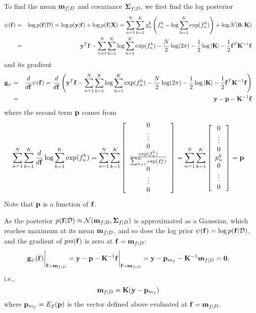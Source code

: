 \documentclass{article}
\begin{document}
To find the mean ${\bf m}_{f|D}$ and covariance ${\bf\Sigma}_{f|D}$,
we first find the log posterior
\begin{eqnarray}
  \psi({\bf f})&=&\log p({\bf f}|{\cal D})
  =\log p({\bf y}|{\bf f}) + \log p({\bf f}|{\bf X})
  =\sum_{n=1}^N\sum_{k=1}^K y_n^k\left(f_n^k-\log\sum_{h=1}^K\exp(f_n^h)\right)
  +\log {\cal N}({\bf 0},{\bf K})
  \nonumber\\
  &=&{\bf y}^T{\bf f}-\sum_{n=1}^N\sum_{k=1}^K \log \sum_{h=1}^K\exp(f_n^h)
  -\frac{N}{2}\log(2\pi)-\frac{1}{2}\log|{\bf K}|
  -\frac{1}{2}{\bf f}^T {\bf K}^{-1}{\bf f}
\end{eqnarray}
and its gradient
\begin{eqnarray}
  {\bf g}_\psi&=&
  \frac{d}{d{\bf f}} \psi({\bf f})=\frac{d}{d{\bf f}} \left(
    {\bf y}^T{\bf f}-\sum_{n=1}^N\sum_{k=1}^K \log \sum_{h=1}^K\exp(f_n^h)
    -\frac{N}{2}\log(2\pi)-\frac{1}{2}\log|{\bf K}|
    -\frac{1}{2}{\bf f}^T {\bf K}^{-1}{\bf f}\right)
  \nonumber\\
  &=&{\bf y}-{\bf p}-{\bf K}^{-1}{\bf f}
\end{eqnarray}
where the second term ${\bf p}$ comes from
\begin{equation}
  \sum_{n=1}^N\sum_{k=1}^K \frac{d}{d{\bf f}} \log \sum_{h=1}^K\exp(f_n^h) 
  =\sum_{n=1}^N\sum_{k=1}^K \left[\begin{array}{c}0\\\vdots\\0\\
      \frac{\exp(f_n^k)}{\sum_{h=1}^K\exp(f_n^h)}\\0\\\vdots\\0\end{array}\right]
  =\sum_{n=1}^N\sum_{k=1}^K \left[\begin{array}{c}0\\\vdots\\0\\
      p_n^k\\0\\\vdots\\0\end{array}\right]={\bf p}
  \label{ppp}
\end{equation}
Note that ${\bf p}$ is a function of ${\bf f}$.

As the posterior
$p({\bf f}|{\cal D})\approx{\cal N}({\bf m}_{f|D},{\bf\Sigma}_{f|D})$
is approximated as a Gaussian, which reaches maximum at its mean 
${\bf m}_{f|D}$, and so does the log prior 
$\psi({\bf f})=\log p({\bf f}|{\cal D})$, and 
the gradient of $psi({\bf f})$ is zero at ${\bf f}={\bf m}_{f|D}$:
\begin{equation}
  {\bf g}_\psi({\bf f})\bigg|_{{\bf f}={\bf m}_{f|D}}
  ={\bf y}-{\bf p}-{\bf K}^{-1}{\bf f}\bigg|_{{\bf f}={\bf m}_{f|D}}
  ={\bf y}-{\bf p}_{m_f}-{\bf K}^{-1}{\bf m}_{f|D}={\bf 0},
\end{equation}
i.e.,
\begin{equation}
  {\bf m}_{f|D}={\bf K}({\bf y}-{\bf p}_{m_f})
  \label{MeanFMC}
\end{equation}
where ${\bf p}_{m_f}=E_f({\bf p})$ is the vector defined above 
evaluated at ${\bf f}={\bf m}_{f|D}$.
\end{document}
